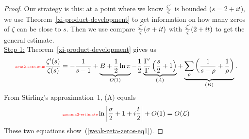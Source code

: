 \begin{proof}
Our strategy is this: at a point where we know $\frac{\zeta'}{\zeta}$ is bounded ($s=2+it$), we use Theorem~\ref{xi-product-development} to get information on how many zeros of $\zeta$ can be close to $s$. Then we use compare $\frac{\zeta'}{\zeta}(\sigma+it)$ with $\frac{\zeta'}{\zeta}(2+it)$ to get the general estimate.\\

\noindent\underline{Step 1:}
Theorem~\ref{xi-product-development} gives us
\begin{equation}\llabel{zeta2-zero-sum}
\frac{\zeta'(s)}{\zeta(s)}=-\rc{s-1}+
\underbrace{B+\rc2\ln\pi}_{O(1)}
-
\rc2\underbrace{\frac{\Ga'}{\Ga}\pa{%
\frac s2+1}}_{(A)}+
\underbrace{\sum_{\rh} \pa{\rc{%
s-\rh}+\rc{\rh}}}_{(B)}.
\end{equation}
From Stirling's approximation~1, (A) equals
\begin{equation}\llabel{gamma2-estimate}
\ln\ab{\frac{\si}{2}+1+i\frac t2}%
+O(1)=
O(\cal L)
\end{equation}
These two equations show~(\ref{weak-zeta-zeros-eq1}).


\end{proof}
